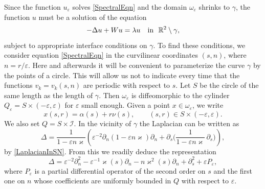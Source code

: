 \documentclass[reqno]{amsart}
\theoremstyle{plain}
\numberwithin{equation}{section}
\renewcommand{\kappa}{\varkappa}
\newcommand{\Real}{\mathbb R}
\newcommand{\eps}{\varepsilon}
\newcommand{\cI}{\mathcal{I}}
\begin{document}
Since the function $u_\eps$ solves \eqref{SpectralEqn} and the domain $\omega_\eps$ shrinks to $\gamma$, the function $u$ must be a solution of the equation
\begin{equation}\label{EqnForU}
-\Delta u+Wu= \lambda u \quad \hbox{in \ } \Real^2\setminus \gamma,
\end{equation}
subject to appropriate interface conditions on $\gamma$.
To find these conditions, we consider equation \eqref{SpectralEqn} in the curvilinear coordinates $(s,n)$, where $n=r/\eps$. Here and afterwards it will be convenient to parameterize the curve $\gamma$ by the points of a circle. This  will allow us not to indicate every time that the functions $v_k=v_k(s,n)$ are periodic with respect to $s$.
Let $S$ be the circle of the same length as the length of $\gamma$.
Then $\omega_\eps$ is diffeomorphic to the cylinder $Q_\eps=S\times (-\eps, \eps)$ for $\eps$ small enough. Given a point $x\in \omega_\eps$, we write
\begin{equation*}
    x(s,r)=\alpha(s)+r\nu(s), \qquad (s,r)\in S\times (-\eps, \eps).
\end{equation*}
We also set  $Q=S\times \cI$.
In the vicinity of $\gamma$ the Laplacian can be written as
\begin{equation*}
  \Delta =\frac1{1-\eps n\kappa}\left( \eps^{-2}\partial_n
  (1-\eps n\kappa)\partial_n +\partial_s
  \Big(\frac1{1-\eps n\kappa}\,\partial_s\Big)\right),
\end{equation*}
by \eqref{LaplacianInSN}.
From this we readily deduce the  representation
\begin{equation}\label{LaplaceExpansion}
\Delta= \eps^{-2}\partial^2_n-\eps^{-1}\kappa(s)\partial_n
-n\kappa^2(s)\partial_n+\partial^2_s+\eps P_\eps,
\end{equation}
where $P_\eps$ is a partial differential operator of the second order on $s$ and the first one on $n$ whose coefficients  are uniformly bounded in $Q$ with respect to $\eps$.
\end{document}
